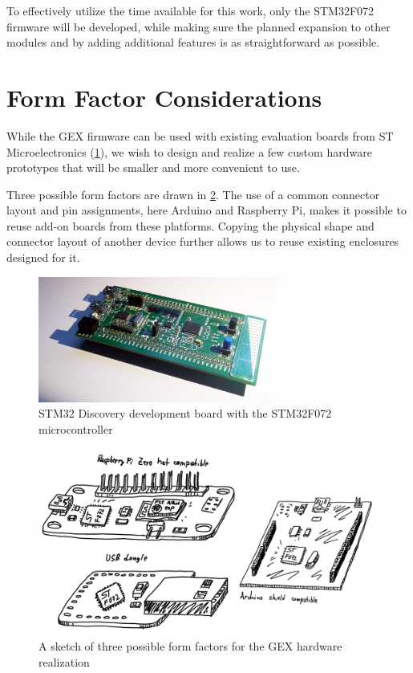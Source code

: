 To effectively utilize the time available for this work, only the STM32F072 firmware will be developed, while making sure the planned expansion to other modules and by adding additional features is as straightforward as possible.

\section{Form Factor Considerations} \label{sec:formfactors}

While the GEX firmware can be used with existing evaluation boards from ST Microelectronics (\cref{fig:discovery}), we wish to design and realize a few custom hardware prototypes that will be smaller and more convenient to use.

Three possible form factors are drawn in \cref{fig:ff_sketches}. The use of a common connector layout and pin assignments, here Arduino and Raspberry Pi, makes it possible to reuse add-on boards from these platforms. Copying the physical shape and connector layout of another device further allows us to reuse existing enclosures designed for it.

\begin{figure}[h]
	\centering
	\includegraphics[width=0.7\textwidth] {img/disco072.jpg}
	\caption[Discovery board with STM32F072]{\label{fig:discovery}STM32 Discovery development board with the STM32F072 microcontroller}
\end{figure}

\begin{figure}[h]
	\centering
	\includegraphics[width=\textwidth] {img/gex-ff-sketches.png}
	\caption[Form factor sketches]{\label{fig:ff_sketches}A sketch of three possible form factors for the GEX hardware realization}
\end{figure}









